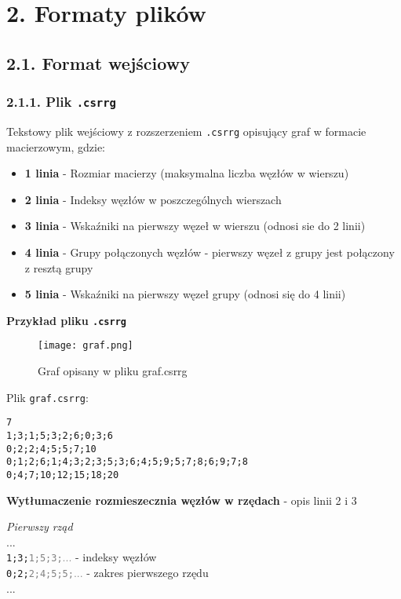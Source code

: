 \documentclass[]{article}
\begin{document}
\section{2. Formaty plików}
\subsection{2.1. Format wejściowy}


\subsubsection{2.1.1. Plik \texttt{.csrrg}}

Tekstowy plik wejściowy z rozszerzeniem \texttt{.csrrg} opisujący graf w formacie macierzowym, gdzie:
\begin{itemize}
    \item 
    \textbf{1 linia} - Rozmiar macierzy (maksymalna liczba węzłów w wierszu)
    \item 
    \textbf{2 linia} - Indeksy węzłów w poszczególnych wierszach
    \item 
    \textbf{3 linia} - Wskaźniki na pierwszy węzeł w wierszu (odnosi sie do 2 linii)
    \item 
    \textbf{4 linia} - Grupy połączonych węzłów - pierwszy węzeł z grupy jest połączony z resztą grupy
    \item 
    \textbf{5 linia} - Wskaźniki na pierwszy węzeł grupy (odnosi się do 4 linii)
\end{itemize}
\textbf{Przykład pliku \texttt{.csrrg}}
\begin{figure}[H]
    \centering
    \texttt{[image: graf.png]}
    \caption{Graf opisany w pliku graf.csrrg}
    \label{fig:enter-label}
\end{figure}

Plik \texttt{graf.csrrg}:

\begin{lstlisting}
7
1;3;1;5;3;2;6;0;3;6
0;2;2;4;5;5;7;10
0;1;2;6;1;4;3;2;3;5;3;6;4;5;9;5;7;8;6;9;7;8
0;4;7;10;12;15;18;20
\end{lstlisting}
\textbf{Wytłumaczenie rozmieszecznia węzłów w rzędach} - opis linii 2 i 3


\textit{Pierwszy rząd}\\
...\\
\texttt{1;3;}\textcolor{gray}{\texttt{1;5;3;}...} - indeksy węzłów\\
\texttt{0;2;}\textcolor{gray}{\texttt{2;4;5;5;}...} - zakres pierwszego rzędu\\
...
\end{document}
